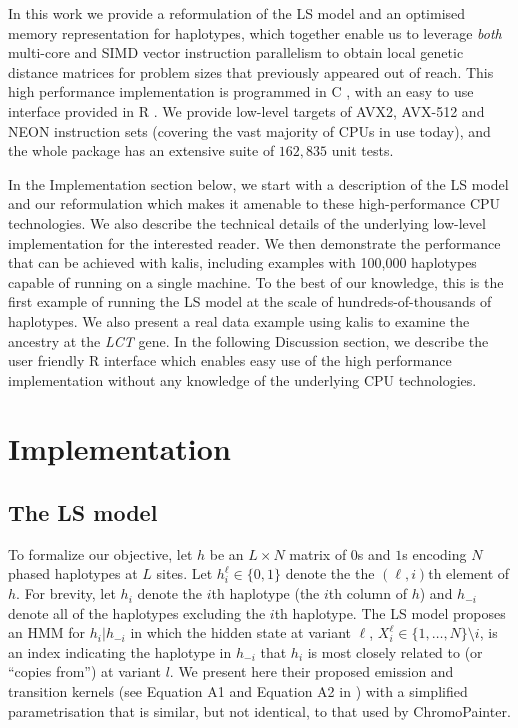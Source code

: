 \documentclass[pdflatex,referee,lineno,sn-nature]{sn-jnl}%
\let\proglang=\textsf
\newcommand{\pkg}[1]{{\fontseries{m}\fontseries{b}\selectfont #1}}
\begin{document}
In this work we provide a reformulation of the LS model and an optimised memory representation for haplotypes, which together enable us to leverage \emph{both} multi-core and SIMD vector instruction parallelism to obtain local genetic distance matrices for problem sizes that previously appeared out of reach.
This high performance implementation is programmed in \proglang{C} \cite{C18}, with an easy to use interface provided in \proglang{R} \cite{R}.
We provide low-level targets of AVX2, AVX-512 and NEON instruction sets (covering the vast majority of CPUs in use today), and the whole package has an extensive suite of \(162,835\) unit tests.

In the Implementation section below, we start with a description of the LS model and our reformulation which makes it amenable to these high-performance CPU technologies.
We also describe the technical details of the underlying low-level implementation for the interested reader.
We then demonstrate the performance that can be achieved with \pkg{kalis}, including examples with 100,000 haplotypes capable of running on a single machine.
To the best of our knowledge, this is the first example of running the LS model at the scale of hundreds-of-thousands of haplotypes.
We also present a real data example using \pkg{kalis} to examine the ancestry at the \emph{LCT} gene.
In the following Discussion section, we describe the user friendly \proglang{R} interface which enables easy use of the high performance implementation without any knowledge of the underlying CPU technologies.



\section*{Implementation}

\subsection*{The LS model}
\label{sec:lsmodel}

To formalize our objective, let \(h\) be an \(L \times N\) matrix of \(0\)s and \(1\)s encoding \(N\) phased haplotypes at \(L\) sites.
Let \(h_i^{\ell} \in \{0,1\}\) denote the the \((\ell,i)\)th element of \(h\).
For brevity, let \(h_i\) denote the \(i\)th haplotype (the \(i\)th column of \(h\)) and \(h_{-i}\) denote all of the haplotypes excluding the \(i\)th haplotype.
The LS model proposes an HMM for \(h_i | h_{-i}\) in which the hidden state at variant \(\ell\), \(X^{\ell}_i \in \{1,\dots,N\} \setminus i\), is an index indicating the haplotype in \(h_{-i}\) that \(h_i\) is most closely related to (or ``copies from'') at variant \(l\).
We present here their proposed emission and transition kernels (see Equation A1 and Equation A2 in \cite{Li2213}) with a simplified parametrisation that is similar, but not identical, to that used by ChromoPainter.
\end{document}
